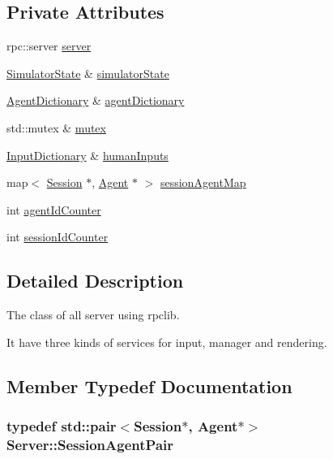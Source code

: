 \subsection*{Private Attributes}
\begin{DoxyCompactItemize}
\item 
rpc\+::server \hyperlink{classServer_a3f6f17fe0e321f0e4fc6bed80a5efc3d}{server}
\item 
\hyperlink{main_8hpp_a4cb9f4bcd812094244f1949a88671bb8}{Simulator\+State} \& \hyperlink{classServer_a1e6a901e88f3a8b2d2fea253e32952e4}{simulator\+State}
\item 
\hyperlink{Server_8hpp_acc6d6e73aa06631da7c2f627f9979d64}{Agent\+Dictionary} \& \hyperlink{classServer_ae45bd58f8585e0c47e5140a055cad09c}{agent\+Dictionary}
\item 
std\+::mutex \& \hyperlink{classServer_a9a508fe15f3a6e3b2e3750b0ff2d5798}{mutex}
\item 
\hyperlink{Server_8hpp_a49cc8333bde52a7f1eb36bdb3e4e8a06}{Input\+Dictionary} \& \hyperlink{classServer_a3d62b0bc3c31161790b118717a4c4718}{human\+Inputs}
\item 
map$<$ \hyperlink{structServer_1_1Session}{Session} $\ast$, \hyperlink{classAgent}{Agent} $\ast$ $>$ \hyperlink{classServer_ad19c76785348bfd91a941aa78ef6a35c}{session\+Agent\+Map}
\item 
int \hyperlink{classServer_ac179860cef2427f743ff1daefa881eb2}{agent\+Id\+Counter}
\item 
int \hyperlink{classServer_abcdb8b5ca33795cdd8f252cf4c3e4f0f}{session\+Id\+Counter}
\end{DoxyCompactItemize}


\subsection{Detailed Description}
The class of all server using rpclib. 

It have three kinds of services for input, manager and rendering. 

\subsection{Member Typedef Documentation}
\subsubsection[{\texorpdfstring{Session\+Agent\+Pair}{SessionAgentPair}}]{\setlength{\rightskip}{0pt plus 5cm}typedef std\+::pair$<${\bf Session}$\ast$, {\bf Agent}$\ast$$>$ {\bf Server\+::\+Session\+Agent\+Pair}\hspace{0.3cm}{\ttfamily [private]}}\hypertarget{classServer_a5b3a89ca943df0f41fdf902a0c2147f3}{}\label{classServer_a5b3a89ca943df0f41fdf902a0c2147f3}


